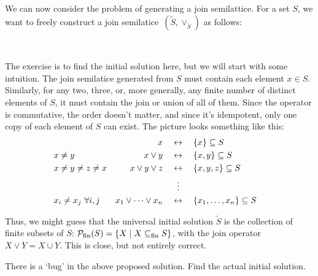 We can now consider the problem of generating a join semilattice.  For a set
$S$, we want to freely construct a join 
semilatice~$(\widetilde S,\vee_{\widetilde S})$ as follows:
\begin{center}
    \\[2mm]
\end{center}
The exercise is to find the initial solution here, but we will start with some
intuition. The join semilatice generated from $S$ must contain each element
$x\in S$. Similarly, for any two, three, or, more generally, any finite
number of distinct elements of $S$, it must contain the join or union of all
of them.  Since the operator is commutative, the order doesn't matter, and
since it's idempotent, only one copy of each element of $S$ can exist. The
picture looks something like this:
\begin{align*}
& 
&
x  & \quad\leftrightarrow\quad \{ x \} \subseteq S 
\\
& x\not= y 
& x \lor y & \quad\leftrightarrow\quad \{ x,y \} \subseteq S 
\\
& x\not= y \not= z \not= x 
&
x \lor y \lor z & \quad\leftrightarrow\quad \{ x,y,z \} \subseteq S 
\\
& & 
& \,\enspace\quad\vdots &
\\
&
x_i \not= x_j\ \forall i,j
& x_1 \lor \cdots \lor x_n & \quad\leftrightarrow\quad \{ x_1, \ldots, x_n \}
\subseteq S
\end{align*}

Thus, we might guess that the universal initial solution $\widetilde{S}$ is
the collection of finite subsets of $S$: $\mathcal{P}_{\mathrm{fin}}(S) =
\{ X \mid
X \subseteq_\mathrm{fin} S \}$, with the join operator $X \lor Y = X \cup Y$.
This is close, but not entirely correct.

\begin{exercise}
There is a `bug' in the above proposed solution. Find the actual initial
solution.\label{ex:bug}  
\end{exercise}

